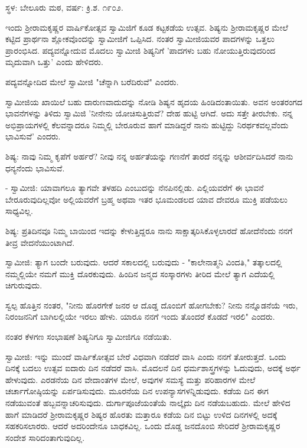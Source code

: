 \begin{center}
ಸ್ಥಳ: ಬೇಲೂರು ಮಠ, ವರ್ಷ: ಕ್ರಿ.ಶ. ೧೯೦೨.
\end{center}

ಇಂದು ಶ‍್ರೀರಾಮಕೃಷ್ಣರ ವಾರ್ಷಿಕೋತ್ಸವ ಸ್ವಾಮಿಜಿಗೆ ಕೂಡ ಕಟ್ಟಕಡೆಯ ಉತ್ಸವ. ಶಿಷ್ಯನು ಶ‍್ರೀರಾಮಕೃಷ್ಣರ ಮೇಲೆ ಕಟ್ಟಿದ ಪ್ರಾರ್ಥನಾ ಶ್ಲೋಕವೊಂದನ್ನು ಸ್ವಾಮೀಜಿಗೆ ಒಪ್ಪಿಸಿದ. ನಂತರ ಸ್ವಾಮೀಜಿಯವರ ಪಾದಗಳನ್ನು ಒತ್ತಲು ಪ್ರಾರಂಭಿಸಿದ. ಪದ್ಯವನ್ನೋದುವ ಮೊದಲು ಸ್ವಾಮೀಜಿ ಶಿಷ್ಯನಿಗೆ 'ಪಾದಗಳು ಬಹು ನೋಯುತ್ತಿರುವುದರಿಂದ ಮೃದುವಾಗಿ ಒತ್ತು' ಎಂದು ಹೇಳಿದರು.

ಪದ್ಯವನ್ನೋದಿದ ಮೇಲೆ ಸ್ವಾಮೀಜಿ "ಚೆನ್ನಾಗಿ ಬರೆದಿರುವೆ" ಎಂದರು.

ಸ್ವಾಮೀಜಿಯ ಖಾಯಿಲೆ ಬಹು ದಾರುಣವಾದುದನ್ನು ನೋಡಿ ಶಿಷ್ಯನ ಹೃದಯ ಹಿಂಡಿದಂತಾಯಿತು. ಅವನ ಅಂತರಂಗದ ಭಾವನೆಗಳನ್ನು ತಿಳಿದು ಸ್ವಾಮಿಜಿ 'ನೀನೇನು ಯೋಚಿಸುತ್ತಿರುವೆ? ದೇಹ ಹುಟ್ಟಿ ಆಗಿದೆ. ಅದು ಸತ್ತೇ ತೀರಬೇಕು. ನನ್ನ ಅಭಿಪ್ರಾಯಗಳಲ್ಲಿ ಕೆಲವನ್ನಾದರೂ ನಿಮ್ಮಲ್ಲಿ ಬೇರೂರುವ ಹಾಗೆ ಮಾಡಿದ್ದರೆ ನಾನು ಹುಟ್ಟಿದ್ದು ನಿರರ್ಥಕವಲ್ಲವೆಂದು ಭಾವಿಸುವೆ' ಎಂದರು.

ಶಿಷ್ಯ: ನಾವು ನಿಮ್ಮ ಕೃಪೆಗೆ ಅರ್ಹರೆ? ನೀವು ನನ್ನ ಅರ್ಹತೆಯನ್ನು ಗಣನೆಗೆ ತಾರದೆ ನನ್ನನ್ನು ಆಶೀರ್ವದಿಸಿದರೆ ನಾನು ಧನ್ಯನೆಂದು ಭಾವಿಸುವೆ.

- ಸ್ವಾಮೀಜಿ: ಯಾವಾಗಲೂ ತ್ಯಾಗವೇ ತಳಹದಿ ಎಂಬುದನ್ನು ನೆನಪಿನಲ್ಲಿಡು. ಎಲ್ಲಿಯವರೆಗೆ ಈ ಭಾವನೆ ಬೇರೂರುವುದಿಲ್ಲವೋ ಅಲ್ಲಿಯವರೆಗೆ ಬ್ರಹ್ಮ ಅಥವಾ ಇತರ ಭೂಮಂಡಲದ ಯಾವ ದೇವರೂ ಮುಕ್ತಿ ಪಡೆಯಲು ಸಾಧ್ಯವಿಲ್ಲ.

ಶಿಷ್ಯ: ಪ್ರತಿದಿನವೂ ನಿಮ್ಮ ಬಾಯಿಂದ ಇದನ್ನು ಕೇಳುತ್ತಿದ್ದರೂ ನಾನು ಸಾಕ್ಷಾತ್ಕರಿಸಿಕೊಳ್ಳಲಾರದೆ ಹೋದೆನೆಂದು ನನಗೆ ತೀವ್ರ ವೇದನೆಯುಂಟಾಗಿದೆ.

ಸ್ವಾಮೀಜಿ: ತ್ಯಾಗ ಬಂದೇ ಬರುವುದು. ಆದರೆ ಸಕಾಲದಲ್ಲಿ ಬರುವುದು - "ಕಾಲೇನಾತ್ಮನಿ ವಿಂದತಿ," ತತ್ಕಾಲದಲ್ಲಿ ನಮ್ಮಲ್ಲಿಯೇ ನಮಗೆ ಮುಕ್ತಿ ದೊರಕುವುದು. ಹಿಂದಿನ ಜನ್ಮದ ಸಂಸ್ಕಾರಗಳು ತೀರಿದ ಮೇಲೆ ತ್ಯಾಗ ಎದೆಯಲ್ಲಿ ಚಿಗುರುವುದು.

ಸ್ವಲ್ಪ ಹೊತ್ತಿನ ನಂತರ, "ನೀನು ಹೊರಗೇಕೆ ಜನರ ಆ ದೊಡ್ಡ ದೊಂಬಿಗೆ ಹೋಗಬೇಕು? ನೀನು ನನ್ನೊಡನೆಯೆ ಇರು, ನಿರಂಜನನಿಗೆ ಬಾಗಿಲಲ್ಲಿಯೇ ಇರಲು ಹೇಳು. ಯಾರೂ ನನಗೆ ಇಂದು ತೊಂದರೆ ಕೊಡದೆ ಇರಲಿ" ಎಂದರು.

ನಂತರ ಕೆಳಗಣ ಸಂಭಾಷಣೆ ಶಿಷ್ಯನಿಗೂ ಸ್ವಾಮೀಜಿಗೂ ನಡೆಯಿತು.

ಸ್ವಾಮೀಜಿ: ಇನ್ನು ಮುಂದೆ ವಾರ್ಷಿಕೋತ್ಸವ ಬೇರೆ ವಿಧವಾಗಿ ನಡೆದರೆ ವಾಸಿ ಎಂದು ನನಗೆ ತೋರುತ್ತದೆ. ಒಂದು ದಿನಕ್ಕೆ ಬದಲು ಉತ್ಸವ ಐದಾರು ದಿನ ನಡೆದರೆ ವಾಸಿ. ಮೊದಲನೆ ದಿನ ಧರ್ಮಶಾಸ್ತ್ರಗಳನ್ನು ಓದುವುದು, ಅದಕ್ಕೆ ಅರ್ಥ ಹೇಳುವುದು. ಎರಡನೆಯ ದಿನ ವೇದಾಂತಗಳ ಮೇಲೆ, ಅವುಗಳ ಸಮಸ್ಯೆ ಮತ್ತು ಪರಿಹಾರಗಳ ಮೇಲೆ ಚರ್ಚಾಗೋಷ್ಠಿಯನ್ನು ಏರ್ಪಡಿಸುವುದು. ಮೂರನೆಯ ದಿನ ಉಪನ್ಯಾಸಗಳನ್ನಿಡುವುದು. ಕಡೆಯ ದಿನ ಈಗ ನಡೆಯುವಂತೆ ಹಬ್ಬವನ್ನಾಚರಿಸುವುದು. ದುರ್ಗಾಪೂಜೆಯಂತೆಯೆ ನಾಲ್ಕೈದು ದಿನ ನಡೆಯಬಹುದು. ಮೇಲೆ ಹೇಳಿದ ಹಾಗೆ ಮಾಡಿದರೆ ಶ‍್ರೀರಾಮಕೃಷ್ಣರ ಶಿಷ್ಯರ ಹೊರತು ಮತ್ತಾರೂ ಕಡೆಯ ದಿನ ಬಿಟ್ಟು ಉಳಿದ ದಿನಗಳಲ್ಲಿ ಅದಕ್ಕೆ ಸಹಕರಿಸಲಾರರು. ಆದರೆ ಅದರಿಂದೇನೂ ಬಾಧಕವಿಲ್ಲ. ಒಂದು ದೊಡ್ಡ ಜನದೊಂಬಿ ಸೇರಿದರೆ ಶ‍್ರೀರಾಮಕೃಷ್ಣರ ಸಂದೇಶ ಸಾರಿದಂತಾಗುವುದಿಲ್ಲ.

